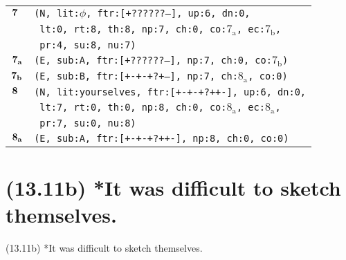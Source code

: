 \documentclass{article}
\begin{document}
\begin{minipage}{\textwidth}
{\begin{tabular}{|r|l|}
    ${\textbf{\textrm{7}}_{\phantom{z}}}$ & \texttt{\texttt{(N,~lit:$\phi$,~ftr:[+??????--],~up:6,~dn:0,}} \\
    & \texttt{\texttt{~lt:0,~rt:8,~th:8,~np:7,~ch:0,~co:${\textrm{7}_{\textrm{a}}}$,~ec:${\textrm{7}_{\textrm{b}}}$,}} \\
    & \texttt{\texttt{~pr:4,~su:8,~nu:7)}} \\
    ${\textbf{\textrm{7}}_{\textbf{\textrm{a}}}}$ & \texttt{\texttt{(E,~sub:A,~ftr:[+??????--],~np:7,~ch:0,~co:${\textrm{7}_{\textrm{b}}}$)}} \\
    ${\textbf{\textrm{7}}_{\textbf{\textrm{b}}}}$ & \texttt{\texttt{(E,~sub:B,~ftr:[+-+-+?+--],~np:7,~ch:${\textrm{8}_{\textrm{a}}}$,~co:0)}} \\
    ${\textbf{\textrm{8}}_{\phantom{z}}}$ & \texttt{\texttt{(N,~lit:yourselves,~ftr:[+-+-+?++-],~up:6,~dn:0,}} \\
    & \texttt{\texttt{~lt:7,~rt:0,~th:0,~np:8,~ch:0,~co:${\textrm{8}_{\textrm{a}}}$,~ec:${\textrm{8}_{\textrm{a}}}$,}} \\
    & \texttt{\texttt{~pr:7,~su:0,~nu:8)}} \\
    ${\textbf{\textrm{8}}_{\textbf{\textrm{a}}}}$ & \texttt{\texttt{(E,~sub:A,~ftr:[+-+-+?++-],~np:8,~ch:0,~co:0)}} \\
    \hline
  \end{tabular}
  }
\end{minipage}
\bigbreak

\clearpage

%
%

\section*{(13.11b) *It was difficult to sketch themselves.}

\bigbreak
\begin{enumerate*}
\item[(13.11b)] *It was difficult to sketch themselves.
\end{enumerate*}
\bigbreak
\end{document}
